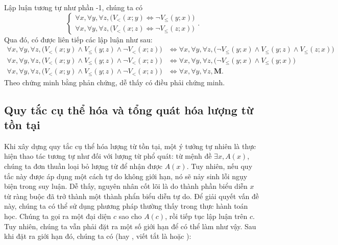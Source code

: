 \stepSubexercise Lập luận tương tự như phần \the\numexpr\value{subexercise}-1\relax, chúng ta có
$$
   \begin{cases}
      \forall x, \forall y, \forall z, \big(V_<(x; y) \iff \neg V_\le(y; x)\big) \\
      \forall x, \forall y, \forall z, \big(V_<(x; z) \iff \neg V_\le(z; x)\big)
   \end{cases}.
$$
Qua đó, có được liên tiếp các lập luận như sau:
\begin{align*}
   \forall x, \forall y, \forall z, \big(V_<(x; y) \land V_\le(y; z) \land \neg V_<(x; z)\big) &\iff \forall x, \forall y, \forall z, \big(\neg V_\le(y; x) \land V_\le(y; z) \land V_\le(z; x)\big) \\
   \forall x, \forall y, \forall z, \big(V_<(x; y) \land V_\le(y; z) \land \neg V_<(x; z)\big) &\iff \forall x, \forall y, \forall z, \big(\neg V_\le(y; x) \land V_\le(y; x)\big) \\
   \forall x, \forall y, \forall z, \big(V_<(x; y) \land V_\le(y; z) \land \neg V_<(x; z)\big) &\iff \forall x, \forall y, \forall z, \mathbf{M}.
\end{align*}
Theo chứng minh bằng phản chứng, dễ thấy có điều phải chứng minh.

\subsection{Quy tắc cụ thể hóa và tổng quát hóa lượng từ tồn tại}

Khi xây dựng quy tắc cụ thể hóa lượng từ tồn tại, một ý tưởng tự nhiên là thực hiện thao tác tương tự như đối với lượng từ phổ quát: từ mệnh đề $\exists x, A(x)$, chúng ta đơn thuần loại bỏ lượng từ để nhận được $A(x)$. Tuy nhiên, nếu quy tắc này được áp dụng một cách tự do không giới hạn, nó sẽ nảy sinh lỗi ngụy biện trong suy luận. Dễ thấy, nguyên nhân cốt lõi là do thành phần biểu diễn $x$ từ ràng buộc đã trở thành một thành phẩn biểu diễn tự do. Để giải quyết vấn đề này, chúng ta có thể sử dụng phương pháp thường thấy trong thực hành toán học. Chúng ta gọi ra một đại diện $c$ sao cho $A(c)$, rồi tiếp tục lập luận trên $c$. Tuy nhiên, chúng ta vẫn phải đặt ra một số giới hạn để có thể làm như vậy. Sau khi đặt ra giới hạn đó, chúng ta có  (hay , viết tắt là  hoặc ):

